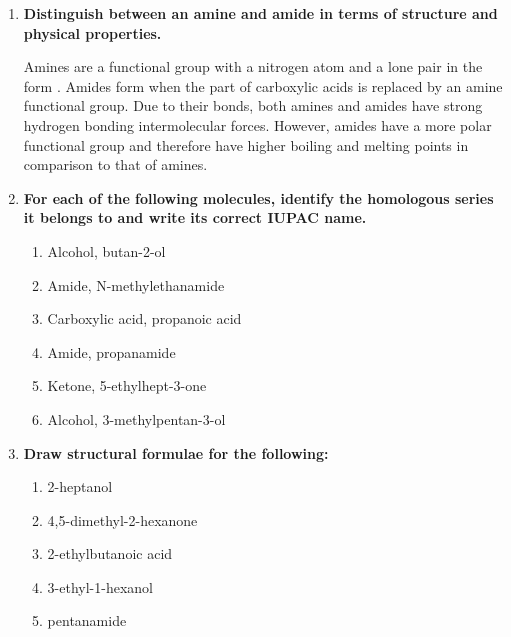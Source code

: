 \documentclass{report}
\begin{document}
\begin{enumerate}
		\item \textbf{Distinguish between an amine and amide in terms of structure and physical properties.}

			Amines are a functional group with a nitrogen atom and a lone pair in the form . Amides form when the  part of carboxylic acids is replaced by an amine functional group. Due to their  bonds, both amines and amides have strong hydrogen bonding intermolecular forces. However, amides have a more polar functional group and therefore have higher boiling and melting points in comparison to that of amines.

		\item \textbf{For each of the following molecules, identify the homologous series it belongs to and write its correct IUPAC name.}
			\begin{enumerate}
				\item Alcohol, butan-2-ol
				\item Amide, N-methylethanamide
				\item Carboxylic acid, propanoic acid
				\item Amide, propanamide
				\item Ketone, 5-ethylhept-3-one
				\item Alcohol, 3-methylpentan-3-ol
			\end{enumerate}

		\item \textbf{Draw structural formulae for the following:}
			\begin{enumerate}
				\item 2-heptanol
					\subitem {} \\

				\item 4,5-dimethyl-2-hexanone
					\subitem {} \\

				\item 2-ethylbutanoic acid
					\subitem {} \\

				\item 3-ethyl-1-hexanol
					\subitem {} \\

				\item pentanamide
					\subitem {} \\


\end{enumerate}
\end{enumerate}
\end{document}
